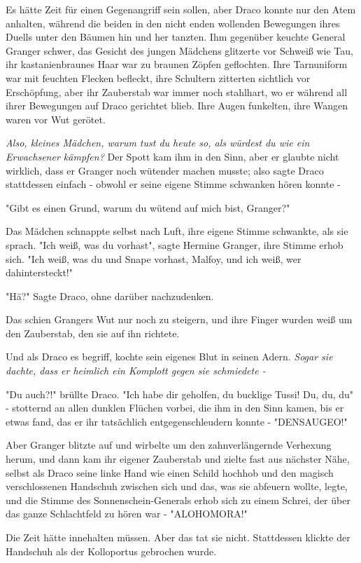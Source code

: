 {Es hätte Zeit für einen Gegenangriff sein sollen, aber Draco konnte nur den Atem anhalten, während die beiden in den nicht enden wollenden Bewegungen ihres Duells unter den Bäumen hin und her tanzten. Ihm gegenüber keuchte General Granger schwer, das Gesicht des jungen Mädchens glitzerte vor Schweiß wie Tau, ihr kastanienbraunes Haar war zu braunen Zöpfen geflochten. Ihre Tarnuniform war mit feuchten Flecken befleckt, ihre Schultern zitterten sichtlich vor Erschöpfung, aber ihr Zauberstab war immer noch stahlhart, wo er während all ihrer Bewegungen auf Draco gerichtet blieb. Ihre Augen funkelten, ihre Wangen waren vor Wut gerötet.

\emph{Also, kleines Mädchen, warum tust du heute so, als würdest du wie ein Erwachsener kämpfen?} Der Spott kam ihm in den Sinn, aber er glaubte nicht wirklich, dass er Granger noch wütender machen musste; also sagte Draco stattdessen einfach - obwohl er seine eigene Stimme schwanken hören konnte -

"Gibt es einen Grund, warum du wütend auf mich bist, Granger?"

Das Mädchen schnappte selbst nach Luft, ihre eigene Stimme schwankte, als sie sprach. "Ich weiß, was du vorhast", sagte Hermine Granger, ihre Stimme erhob sich. "Ich weiß, was du und Snape vorhast, Malfoy, und ich weiß, wer dahintersteckt!"

"Hä?" Sagte Draco, ohne darüber nachzudenken.

Das schien Grangers Wut nur noch zu steigern, und ihre Finger wurden weiß um den Zauberstab, den sie auf ihn richtete.

Und als Draco es begriff, kochte sein eigenes Blut in seinen Adern. \emph{Sogar sie dachte, dass er heimlich ein Komplott gegen sie schmiedete -}

"Du auch?!" brüllte Draco. "Ich habe dir geholfen, du bucklige Tussi! Du, du, du" - stotternd an allen dunklen Flüchen vorbei, die ihm in den Sinn kamen, bis er etwas fand, das er ihr tatsächlich entgegenschleudern konnte - "DENSAUGEO!"

Aber Granger blitzte auf und wirbelte um den zahnverlängernde Verhexung herum, und dann kam ihr eigener Zauberstab und zielte fast aus nächster Nähe, selbst als Draco seine linke Hand wie einen Schild hochhob und den magisch verschlossenen Handschuh zwischen sich und das, was sie abfeuern wollte, legte, und die Stimme des Sonnenschein-Generals erhob sich zu einem Schrei, der über das ganze Schlachtfeld zu hören war - "ALOHOMORA!"

Die Zeit hätte innehalten müssen. Aber das tat sie nicht. Stattdessen klickte der Handschuh als der Kolloportus gebrochen wurde.

}
